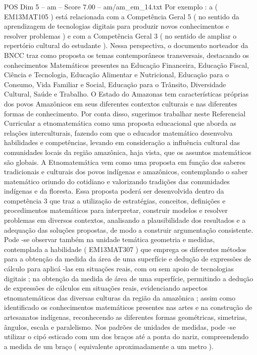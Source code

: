 \begin{textsample}{POS Dim 5 – am – Score 7.00 – am/am\_em\_14.txt}
Por exemplo : a ( EM13MAT105 ) está relacionada com a Competência Geral 5 ( no sentido da aprendizagem de tecnologias digitais para produzir novos conhecimentos e resolver problemas ) e com a Competência Geral 3 ( no sentido de ampliar o repertório cultural do estudante ).
Nessa perspectiva, o documento norteador da BNCC traz como proposta os temas contemporâneos transversais, destacando os conhecimentos Matemáticos presentes na Educação Financeira, Educação Fiscal, Ciência e Tecnologia, Educação Alimentar e Nutricional, Educação para o Consumo, Vida Familiar e Social, Educação para o Trânsito, Diversidade Cultural, Saúde e Trabalho.
O Estado do Amazonas tem características próprias dos povos Amazônicos em seus diferentes contextos culturais e nas diferentes formas de conhecimento.
Por conta disso, sugerimos trabalhar neste Referencial Curricular a etnomatemática como uma proposta educacional que aborda as relações interculturais, fazendo com que o educador matemático desenvolva habilidades e competências, levando em consideração a influência cultural das comunidades locais da região amazônica, haja vista, que os assuntos matemáticos são globais.
A Etnomatemática vem como uma proposta em função dos saberes tradicionais e culturais dos povos indígenas e amazônicos, contemplando o saber matemático oriundo do cotidiano e valorizando tradições das comunidades indígenas e da floresta.
Essa proposta poderá ser desenvolvida dentro da competência 3 que traz a utilização de estratégias, conceitos, definições e procedimentos matemáticos para interpretar, construir modelos e resolver problemas em diversos contextos, analisando a plausibilidade dos resultados e a adequação das soluções propostas, de modo a construir argumentação consistente.
Pode -se observar também na unidade temática geometria e medidas, contemplada a habilidade ( EM13MAT307 ) que emprega os diferentes métodos para a obtenção da medida da área de uma superfície e dedução de expressões de cálculo para aplicá -las em situações reais, com ou sem apoio de tecnologias digitais ; na obtenção da medida de área de uma superfície, permitindo a dedução de expressões de cálculos em situações reais, evidenciando aspectos etnomatemáticos das diversas culturas da região da amazônica ; assim como identificado os conhecimentos matemáticos presentes nas artes e na construção de artesanatos indígenas, reconhecendo as diferentes formas geométricas, simetrias, ângulos, escala e paralelismo.
Nos padrões de unidades de medidas, pode -se utilizar o cipó esticado com um dos braços até a ponta do nariz, compreendendo a medida de um braço ( equivalente aproximadamente a um metro ).

\end{textsample}
